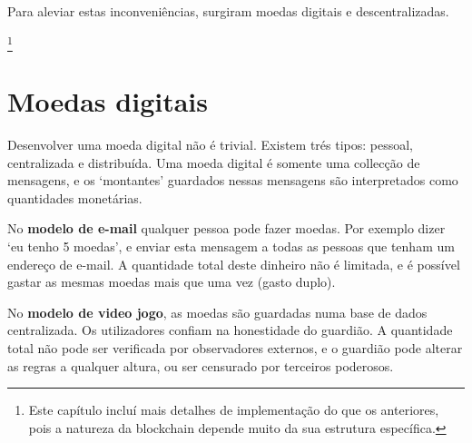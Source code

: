 Para aleviar estas inconveniências, surgiram moedas digitais e descentralizadas.
 

\footnote{Este capítulo incluí mais detalhes de implementação do que os anteriores, pois a natureza da blockchain depende muito da sua estrutura específica.}

\section{Moedas digitais}
\label{sec:digital-currency}

Desenvolver uma moeda digital não é trivial. Existem trés tipos: pessoal, centralizada e distribuída. Uma moeda digital é somente uma collecção de mensagens, e os `montantes' guardados nessas mensagens são interpretados como quantidades monetárias.


No \textbf{modelo de e-mail} qualquer pessoa pode fazer moedas. Por exemplo dizer `eu tenho 5 moedas', e enviar esta mensagem a todas as pessoas que tenham um endereço de e-mail. A quantidade total deste dinheiro não é limitada, e é possível gastar as mesmas moedas mais que uma vez (gasto duplo).


No \textbf{modelo de video jogo}, as moedas são guardadas numa base de dados centralizada. Os utilizadores confiam na honestidade do guardião. A quantidade total não pode ser verificada por observadores externos, e o guardião pode alterar as regras a qualquer altura, ou ser censurado por terceiros poderosos.
  


